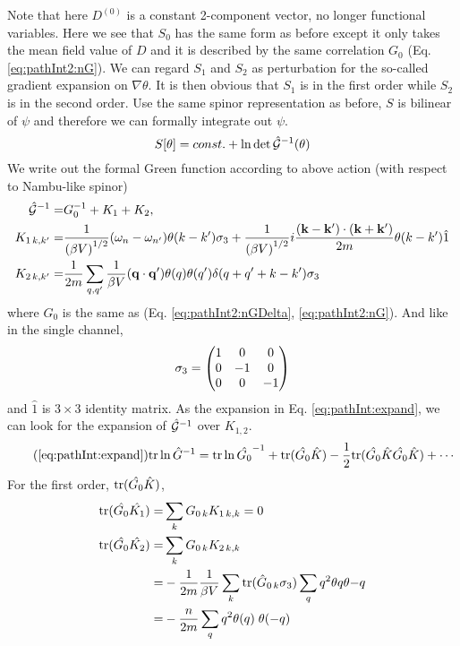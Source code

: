 Note that here $D^{(0)}$ is a constant 2-component vector, no longer functional variables.  Here we see that $S_{0}$ has the same form as before except it only takes the mean field value of $D$ and it is described by the same correlation $G_{0}$ (Eq. \ref{eq:pathInt2:nG}).  We can regard $S_{1}$ and $S_{2}$ as perturbation for the so-called gradient expansion on $\nabla\theta$.  It is then obvious that $S_{1}$ is in the first order while $S_{2}$ is in the second order.  Use the same spinor representation as before, $S$ is bilinear of $\psi$ and therefore we can formally integrate out $\psi$. 
\begin{equation}
S[\theta]=const.+\ln\det\hat{\mathcal{G}}^{-1}(\theta)
\end{equation}
 We write out the formal Green function according to above action (with respect to Nambu-like spinor)
\begin{subequations}
\begin{align}
\hat{\mathcal{G}}^{-1}=&G_{0}^{-1}+K_{1}+K_{2},\\
K_{1\, k,k'}=
	&\frac{1}{({\beta{}V)}^{1/2}}(\omega_n-\omega_{n'})\theta(k-k')\sigma_3+
		\frac{1}{{(\beta{}V)}^{1/2}}i\frac{(\mathbf{k}-\mathbf{k}')\cdot(\mathbf{k}+\mathbf{k}')}{2m}\theta(k-k')\hat{1}\\
K_{2\, k,k'}=
	&\frac{1}{2m}\sum_{q,q'}\frac{1}{{\beta{}V}}(\mathbf{q}\cdot\mathbf{q}')\theta(q)\theta(q')\delta(q+q'+k-k')\sigma_3
\end{align}
\end{subequations}
where $G_{0}$ is the same as (Eq. \eqref{eq:pathInt2:nGDelta}, \eqref{eq:pathInt2:nG}).  And like in the single channel, 
\begin{equation}
\sigma_3=\begin{pmatrix}1&0&0\\0&-1&0\\0&0&-1\end{pmatrix}
\end{equation}
and $\hat{1}$ is $3\times3$ identity matrix.  As the expansion in Eq. \ref{eq:pathInt:expand}, we can look for the expansion of $\hat{\mathcal{G}}^{-1}$ over $K_{1,2}$.  
\begin{equation}\tag{\ref{eq:pathInt:expand}}
\tr\ln \hat{G}^{-1}=\tr\ln\hat{G_{0}}^{-1}+\tr(\hat{G_{0}}\hat{K})-\nth{2}\tr(\hat{G_{0}}\hat{K}\hat{G_{0}}\hat{K})+\cdots
\end{equation}
For the first order, $\text{tr}(\hat{G_{0}}\hat{K})$, 
\begin{align}
\text{tr}(\hat{G_{0}}\hat{K_1})=&\sum_{k}{G_{0\,k}K_{1\,k,k}}=0\\
\text{tr}(\hat{G_{0}}\hat{K_2})=&\sum_{k}{G_{0\,k}K_{2\,k,k}}\nonumber\\
	=&-\frac{1}{2m}\frac{1}{{\beta{}V}}\sum_{k}\text{tr}(\hat{G}_{0\,k}\sigma_3)\sum_{q}q^2\theta{q}\theta{-q}\nonumber\\
	=&-\frac{n}{2m}\sum_{q}q^2\theta{(q)}\;\theta{(-q)}
\end{align}
